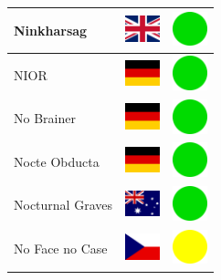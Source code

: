 \documentclass[12pt, a4paper, twoside]{report}
\begin{document}
\begin{center}
\begin{longtable}{|p{5cm}|p{2cm}|p{2cm}|}
 Ninkharsag                                                 & \includegraphics[width=1cm]{../4x3/gb} &   \includegraphics[width=1cm]{../likes/y} \\ \hline
 NIOR                                                       & \includegraphics[width=1cm]{../4x3/de} &   \includegraphics[width=1cm]{../likes/y} \\ \hline
 No Brainer                                                 & \includegraphics[width=1cm]{../4x3/de} &   \includegraphics[width=1cm]{../likes/y} \\ \hline
 Nocte Obducta                                              & \includegraphics[width=1cm]{../4x3/de} &   \includegraphics[width=1cm]{../likes/y} \\ \hline
 Nocturnal Graves                                           & \includegraphics[width=1cm]{../4x3/au} &   \includegraphics[width=1cm]{../likes/y} \\ \hline
 No Face no Case                                            & \includegraphics[width=1cm]{../4x3/cz} &   \includegraphics[width=1cm]{../likes/m} \\ \hline

\end{longtable}
\end{center}
\end{document}
